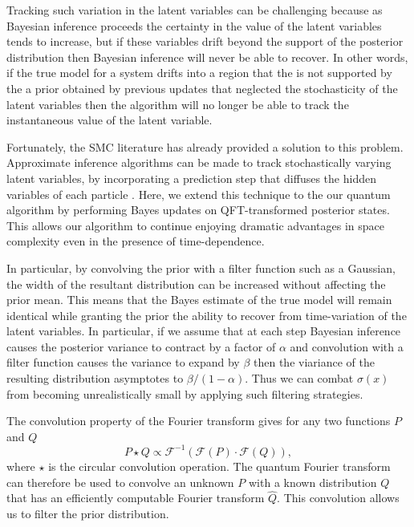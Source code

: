 \documentclass[aps,amsmath,onecolumn,amssymb]{revtex4}
\begin{document}
Tracking such variation in the latent variables can be 
challenging because as Bayesian inference proceeds the certainty in the
value of the latent variables tends to increase, but if these variables drift beyond the support of the posterior distribution
then Bayesian inference will never be able to recover. 
In other words, if the true model for a system drifts into a region that the is not supported by the a prior obtained by previous updates that neglected
the stochasticity of the latent variables then the algorithm will no longer be able to track the instantaneous value of the latent variable.


Fortunately, the SMC literature has already provided a solution to this problem.  Approximate inference algorithms can
be made to track stochastically varying latent variables, by incorporating a prediction step that diffuses the hidden variables
of each particle \cite{isard_condensationconditional_1998}. Here, we extend this technique to the our
quantum algorithm by performing Bayes updates on QFT-transformed posterior
states. This allows our algorithm to continue enjoying dramatic advantages
in space complexity even in the presence of time-dependence.


In particular, by convolving the prior with a filter function such as a
Gaussian, the width of the resultant distribution can be increased without
affecting the prior mean.  This means that the Bayes estimate of the true
model will remain identical while granting the prior the ability to recover
from time-variation of the latent variables.  In particular, if we assume
that at each step Bayesian inference causes the posterior variance to contract
by a factor of $\alpha$ and  convolution with a filter function causes the
variance to expand by $\beta$ then the viariance of the resulting distribution
asymptotes to $\beta/(1-\alpha)$. Thus we can combat $\sigma(x)$ from becoming
unrealistically small by applying such filtering strategies.

The convolution property of the Fourier transform gives for any two functions $P$ and $Q$
\begin{equation}
P \star Q \propto \mathcal{F}^{-1}\left(\mathcal{F}(P) \cdot \mathcal{F}(Q) \right),\label{eq:conv}
\end{equation}
where $\star$ is the circular convolution operation.
The quantum Fourier transform can therefore be used to convolve an unknown $P$ with a known distribution $Q$ that has an efficiently computable Fourier transform $\hat{Q}$.  This
convolution allows us to filter the prior distribution.
\end{document}
